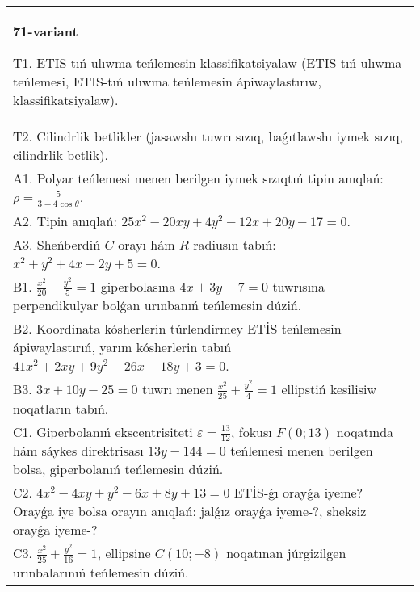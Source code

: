\documentclass{article}
\begin{document}
\begin{tabular}{m{17cm}}
\textbf{71-variant}
\newline

T1. ETIS-tıń ulıwma teńlemesin klassifikatsiyalaw (ETIS-tıń ulıwma teńlemesi, ETIS-tıń ulıwma teńlemesin ápiwaylastırıw, klassifikatsiyalaw).\\

T2. Cilindrlik betlikler (jasawshı tuwrı sızıq, baǵıtlawshı iymek sızıq, cilindrlik betlik).\\

A1. Polyar teńlemesi menen berilgen iymek sızıqtıń tipin anıqlań: $\rho=\frac{5}{3-4\cos\theta}$.\\

A2. Tipin anıqlań: $25 x^{2}-20 xy+4 y^{2}-12 x+20 y-17=0$.\\

A3. Sheńberdiń $C$ orayı hám $R$ radiusın tabıń: $x^2+y^2+4 x-2 y+5=0$.\\

B1. $\frac{x^{2}}{20} - \frac{y^{2}}{5} = 1$ giperbolasına $4x + 3y - 7 = 0$ tuwrısına perpendikulyar bolǵan urınbanıń teńlemesin dúziń.  \\

B2. Koordinata kósherlerin túrlendirmey ETİS teńlemesin ápiwaylastırıń, yarım kósherlerin tabıń $41x^{2} + 2xy + 9y^{2} - 26x - 18y + 3 = 0$.  \\

B3. $3x + 10y - 25 = 0$ tuwrı menen $\frac{x^{2}}{25} + \frac{y^{2}}{4} = 1$ ellipstiń kesilisiw noqatların tabıń.\\

C1. Giperbolanıń ekscentrisiteti $\varepsilon = \frac{13}{12}$, fokusı $F(0;13)$ noqatında hám sáykes direktrisası $13y - 144 = 0$ teńlemesi menen berilgen bolsa, giperbolanıń teńlemesin dúziń.  \\

C2. $4x^{2} - 4xy + y^{2} - 6x + 8y + 13 = 0$ ETİS-ǵı orayǵa iyeme? Orayǵa iye bolsa orayın anıqlań: jalǵız orayǵa iyeme-?, sheksiz orayǵa iyeme-?  \\

C3. $\frac{x^{2}}{25} + \frac{y^{2}}{16} = 1$, ellipsine $C(10; - 8)$ noqatınan júrgizilgen urınbalarınıń teńlemesin dúziń.  \\

\end{tabular}
\vspace{1cm}
\end{document}

